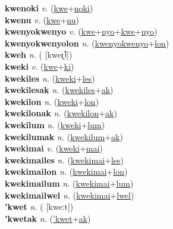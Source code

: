\textbf{kwenoki} \textit{v.} (\hyperref[kwe]{kwe}+\hyperref[noki]{noki})
 \label{kwenoki} \\
\textbf{kwenu} \textit{v.} (\hyperref[kwe]{kwe}+\hyperref[nu]{nu})
 \label{kwenu} \\
\textbf{kwenyokwenyo} \textit{v.} (\hyperref[kwe]{kwe}+\hyperref[nyo]{nyo}+\hyperref[kwe]{kwe}+\hyperref[nyo]{nyo})
 \label{kwenyokwenyo} \\
\textbf{kwenyokwenyolon} \textit{n.} (\hyperref[kwenyokwenyo]{kwenyokwenyo}+\hyperref[lon]{lon})
 \label{kwenyokwenyolon} \\
\textbf{kweh} \textit{n.} ( [kweɪ̯˥])
 \label{kweh} \\
\textbf{kweki} \textit{v.} (\hyperref[kwe]{kwe}+\hyperref[ki]{ki})
 \label{kweki} \\
\textbf{kwekiles} \textit{n.} (\hyperref[kweki]{kweki}+\hyperref[les]{les})
 \label{kwekiles} \\
\textbf{kwekilesak} \textit{n.} (\hyperref[kwekiles]{kwekiles}+\hyperref[ak]{ak})
 \label{kwekilesak} \\
\textbf{kwekilon} \textit{n.} (\hyperref[kweki]{kweki}+\hyperref[lon]{lon})
 \label{kwekilon} \\
\textbf{kwekilonak} \textit{n.} (\hyperref[kwekilon]{kwekilon}+\hyperref[ak]{ak})
 \label{kwekilonak} \\
\textbf{kwekilum} \textit{n.} (\hyperref[kweki]{kweki}+\hyperref[lum]{lum})
 \label{kwekilum} \\
\textbf{kwekilumak} \textit{n.} (\hyperref[kwekilum]{kwekilum}+\hyperref[ak]{ak})
 \label{kwekilumak} \\
\textbf{kwekimai} \textit{v.} (\hyperref[kweki]{kweki}+\hyperref[mai]{mai})
 \label{kwekimai} \\
\textbf{kwekimailes} \textit{n.} (\hyperref[kwekimai]{kwekimai}+\hyperref[les]{les})
 \label{kwekimailes} \\
\textbf{kwekimailon} \textit{n.} (\hyperref[kwekimai]{kwekimai}+\hyperref[lon]{lon})
 \label{kwekimailon} \\
\textbf{kwekimailum} \textit{n.} (\hyperref[kwekimai]{kwekimai}+\hyperref[lum]{lum})
 \label{kwekimailum} \\
\textbf{kwekimailwel} \textit{n.} (\hyperref[kwekimai]{kwekimai}+\hyperref[lwel]{lwel})
 \label{kwekimailwel} \\
\textbf{'kwet} \textit{n.} ( [kweːt])
 \label{'kwet} \\
\textbf{'kwetak} \textit{n.} (\hyperref['kwet]{'kwet}+\hyperref[ak]{ak})
